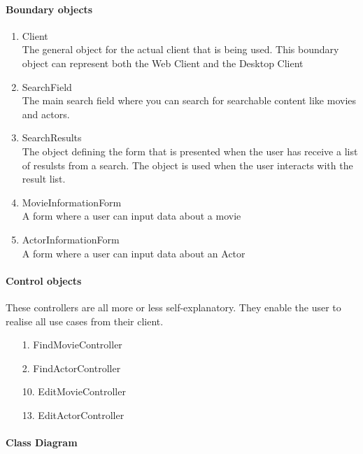 \paragraph{Boundary objects}

\begin{enumerate}

	\item Client \hfill \\
	The general object for the actual client that is being used. This boundary object can represent both the Web Client and the Desktop Client

	\item SearchField \hfill \\
	The main search field where you can search for searchable content like movies and actors.
	
	\item SearchResults \hfill \\
	The object defining the form that is presented when the user has receive a list of resulsts from a search. The object is used when the user interacts with the result list.
	
	
	\item MovieInformationForm \hfill \\
	A form where a user can input data about a movie
	
	\item ActorInformationForm \hfill \\
	A form where a user can input data about an Actor
	
	
\end{enumerate}

\paragraph{Control objects}

These controllers are all more or less self-explanatory. They enable the user to realise all use cases from their client.

\begin{enumerate}
	\item[1.] FindMovieController
	\item[2.] FindActorController
 	\item[10.] EditMovieController
 	\item[13.] EditActorController
 	
\end{enumerate}

\paragraph{Class Diagram}

